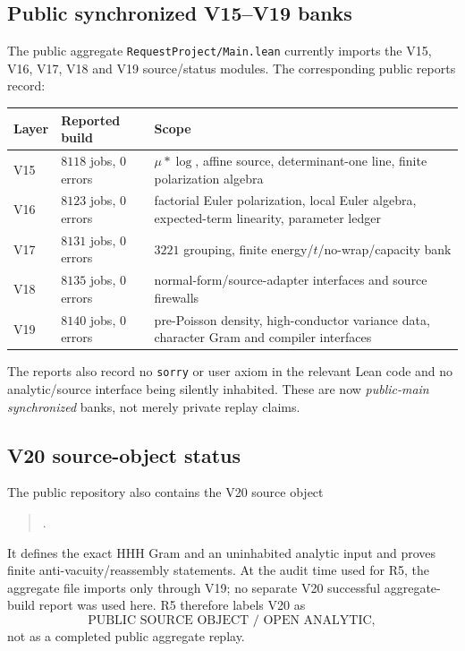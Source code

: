 \documentclass[11pt]{article}
\theoremstyle{definition}
\newcommand{\1}{\mathbf 1}
\begin{document}
\subsection{Public synchronized V15--V19 banks}

The public aggregate \texttt{RequestProject/Main.lean} currently imports the V15, V16,
V17, V18 and V19 source/status modules.  The corresponding public reports record:

\begin{center}
\small
\begin{tabularx}{0.98\textwidth}{>{\raggedright\arraybackslash}p{}
>{\raggedright\arraybackslash}p{}X}
\toprule
Layer & Reported build & Scope\\
\midrule
V15 & $8118$ jobs, $0$ errors & $\mu*\log$, affine source, determinant-one line, finite polarization algebra\\
V16 & $8123$ jobs, $0$ errors & factorial Euler polarization, local Euler algebra, expected-term linearity, parameter ledger\\
V17 & $8131$ jobs, $0$ errors & $3221$ grouping, finite energy/$t$/no-wrap/capacity bank\\
V18 & $8135$ jobs, $0$ errors & normal-form/source-adapter interfaces and source firewalls\\
V19 & $8140$ jobs, $0$ errors & pre-Poisson density, high-conductor variance data, character Gram and compiler interfaces\\
\bottomrule
\end{tabularx}
\end{center}

The reports also record no \texttt{sorry} or user axiom in the relevant Lean code and no
analytic/source interface being silently inhabited.  These are now \emph{public-main
synchronized} banks, not merely private replay claims.

\subsection{V20 source-object status}

The public repository also contains the V20 source object
\begin{quote}\small
{}.
\end{quote}
It defines the exact HHH Gram and an uninhabited analytic input and proves finite
anti-vacuity/reassembly statements.  At the audit time used for R5, the aggregate file
 imports only through V19; no separate V20 successful
aggregate-build report was used here.  R5 therefore labels V20 as
\[
\boxed{\text{PUBLIC SOURCE OBJECT / OPEN ANALYTIC}},
\]
not as a completed public aggregate replay.
\end{document}
